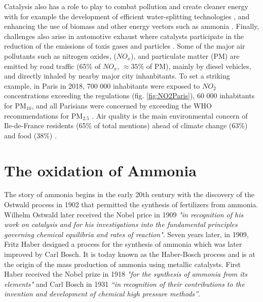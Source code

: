 Catalysis also has a role to play to combat pollution and create cleaner energy with for example the development of efficient water-splitting technologies \parencite{AHMAD2015599}, and enhancing the use of biomass and other energy vectors such as ammonia \parencite{Fang2022}.
Finally, challenges also arise in automotive exhaust where catalysts participate in the reduction of the emissions of toxis gases and particles \parencite{WHOAirPollution, GANDHI2003433}.
Some of the major air pollutants such as nitrogen oxides, ($NO_x$), and particulate matter (PM) are emitted by road traffic (65\% of $NO_x$, $\approx 35\%$ of PM), mainly by diesel vehicles, and directly inhaled by nearby major city inhanbitants.
To set a striking example, in Paris in 2018, 700 000 inhabitants were exposed to $NO_2$ concentrations exceeding the regulations (fig. \ref{fig:NO2Paris}), 60 000 inhabitants for PM$_{10}$, and all Parisians were concerned by exceeding the WHO recommendations for PM$_{2.5}$ \parencite{AirParis}.
Air quality is the main environmental concern of Ile-de-France residents (65\% of total mentions) ahead of climate change (63\%) and food (38\%) \parencite{AirParis}.

\section{The oxidation of Ammonia}

The story of ammonia begins in the early 20th century with the discovery of the Ostwald process in 1902 that permitted the synthesis of fertilizers from ammonia.
Wilhelm Ostwald later received the Nobel price in 1909 \textit{"in recognition of his work on catalysis and for his investigations into the fundamental principles governing chemical equilibria and rates of reaction"}.
Seven years later, in 1909, Fritz Haber designed a process for the synthesis of ammonia which was later improved by Carl Bosch.
It is today known as the Haber-Bosch process and is at the origin of the mass production of ammonia using metallic catalysts.
First Haber received the Nobel prize in 1918 \textit{"for the synthesis of ammonia from its elements"} \parencite{Alexander1920} and Carl Bosch in 1931 \textit{“in recognition of their contributions to the invention and development of chemical high pressure methods”}.

